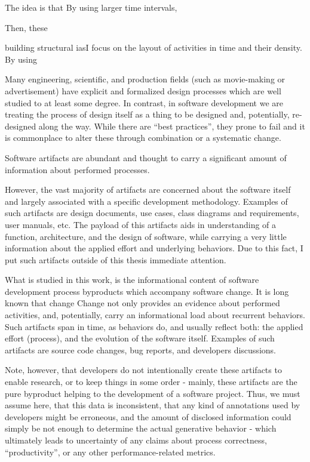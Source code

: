 \documentclass[11pt,oneside]{article}
\numberwithin{equation}{subsection}
\begin{document}
The idea is that 
By using larger
time intervals, 

Then, these

building structural
iasI focus on the layout of activities in time and their density. By using 


Many engineering, scientific, and production fields (such as movie-making or advertisement) have explicit 
and formalized design processes which are well studied to at least some degree. In contrast, in software 
development we are treating the process of design itself as a thing to be designed and, potentially, 
re-designed along the way. While there are ``best practices'', they prone to fail and it is commonplace
to alter these through combination or a systematic change.



Software artifacts are abundant and thought to carry a significant amount of information about performed 
processes.

However, the vast majority of artifacts are concerned about the software itself and largely associated 
with a specific development methodology. Examples of such artifacts are design documents, use cases, class 
diagrams and requirements, user manuals, etc. The payload of this artifacts aids in understanding of 
a function, architecture, and the design of software, while carrying a very little information about the 
applied effort and underlying behaviors. Due to this fact, I put such artifacts outside of this thesis
immediate attention.

What is studied in this work, is the informational content of software development process byproducts 
which accompany software change. It is long known that change Change not only provides an evidence about performed activities, and, potentially, 
carry an informational load about
recurrent behaviors. Such artifacts span in time, as behaviors do, and usually reflect both: the applied 
effort (process), and the evolution of the software itself. 
Examples of such artifacts are source code changes, bug reports, and developers discussions.

Note, however, that developers do not intentionally create these artifacts to enable research, or to keep 
things in some order - mainly, these artifacts are the pure byproduct helping to the development of a 
software project. Thus, we must assume here, that this data is inconsistent, that any kind of annotations 
used by developers might be erroneous, and the amount of disclosed information could simply be not enough
to determine the actual generative behavior - which ultimately leads to uncertainty of any claims about
process correctness, ``productivity'', or any other performance-related metrics. 
\end{document}
